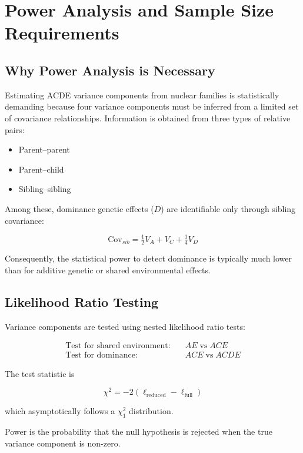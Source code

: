 \section{Power Analysis and Sample Size Requirements}

\subsection{Why Power Analysis is Necessary}

Estimating ACDE variance components from nuclear families is
statistically demanding because four variance components must be
inferred from a limited set of covariance relationships. Information is
obtained from three types of relative pairs:

\begin{itemize}
\item Parent--parent
\item Parent--child
\item Sibling--sibling
\end{itemize}

Among these, dominance genetic effects ($D$) are identifiable only
through sibling covariance:

\[
\text{Cov}_{sib} = \tfrac12 V_A + V_C + \tfrac14 V_D
\]

Consequently, the statistical power to detect dominance is typically
much lower than for additive genetic or shared environmental effects.

\subsection{Likelihood Ratio Testing}

Variance components are tested using nested likelihood ratio tests:

\begin{align}
\text{Test for shared environment:} \quad & AE \; \text{vs} \; ACE \\
\text{Test for dominance:} \quad & ACE \; \text{vs} \; ACDE
\end{align}

The test statistic is

\[
\chi^2 = -2(\ell_{\text{reduced}} - \ell_{\text{full}})
\]

which asymptotically follows a $\chi^2_1$ distribution.

Power is the probability that the null hypothesis is rejected when the
true variance component is non-zero.

